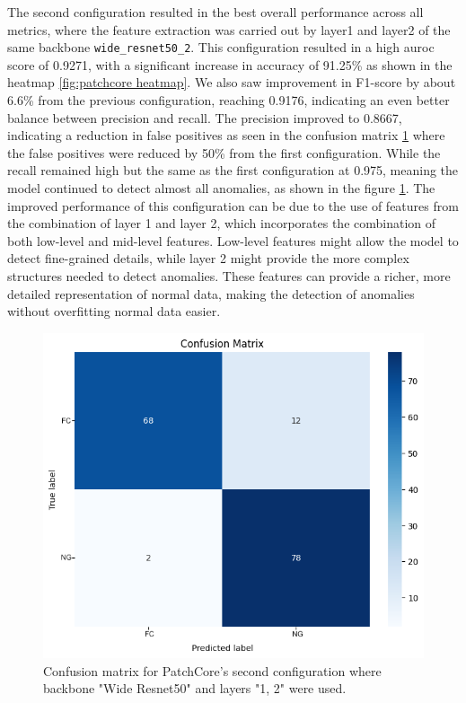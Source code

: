 The second configuration resulted in the best overall performance across all metrics, where the feature extraction was carried out by layer1 and layer2 of the same backbone \texttt{wide\_resnet50\_2}. This configuration resulted in a high \gls{auroc} score of 0.9271, with a significant increase in accuracy of 91.25\% as shown in the heatmap \ref{fig:patchcore heatmap}. We also saw improvement in F1-score by about 6.6\% from the previous configuration, reaching 0.9176, indicating an even better balance between precision and recall. The precision improved to 0.8667, indicating a reduction in false positives as seen in the confusion matrix \ref{fig:patchcore config2 confusion matrix} where the false positives were reduced by 50\% from the first configuration. While the recall remained high but the same as the first configuration at 0.975, meaning the model continued to detect almost all anomalies, as shown in the figure \ref{fig:patchcore config2 confusion matrix}. The improved performance of this configuration can be due to the use of features from the combination of layer 1 and layer 2, which incorporates the combination of both low-level and mid-level features. Low-level features might allow the model to detect fine-grained details, while layer 2 might provide the more complex structures needed to detect anomalies. These features can provide a richer, more detailed representation of normal data, making the detection of anomalies without overfitting normal data easier.

\begin{figure}[ht!]
    \centering
    \includegraphics[width=1\linewidth]{Rohit_Master_Thesis//Images/patchcore_config2_confusion_matrix.png}
    \caption{Confusion matrix for PatchCore's second configuration where backbone "Wide Resnet50" and layers "1, 2" were used.}
    \label{fig:patchcore config2 confusion matrix}
\end{figure}

